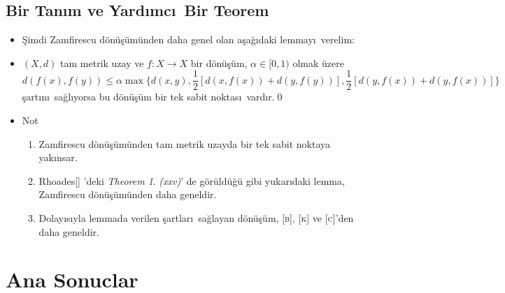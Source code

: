 \documentclass[sans,mathserif,8pt]{beamer}
\begin{document}
\subsection{Bir Tan\i m ve Yard\i mc\i\ Bir Teorem}
\begin{frame}
\begin{itemize}[<+-| alert@+>]  

 \item[] \c{S}imdi Zamfirescu d\"{o}n\"{u}\c{s}\"{u}m\"{u}nden daha genel olan a\c{s}a\u{g}\i daki lemmay\i\ verelim:

 \item[] \begin{lemma}
  $(X,d)$ tam metrik uzay ve $f: X \rightarrow X$ bir d\"{o}n\"{u}\c{s}\"{u}m,
  $\alpha \in [0,1)$ olmak \"uzere
  \begin{equation*}
    d(f(x), f(y))\leq \alpha\max\bigg\{ d(x,y), \frac{1}{2}[d(x,f(x))+d(y,f(y))], \frac{1}{2}[d(y,f(x))+d(y,f(x))] \bigg\} 
  \end{equation*}
  \c{s}art\i n\i\ sa\u{g}l\i yorsa bu d\"{o}n\"{u}\c{s}\"{u}m bir tek sabit noktas\i\ vard\i r.\qed
\end{lemma}

  \item[] \begin{block}{Not}
  \begin{enumerate}
  \item Zamfirescu d\"{o}n\"{u}\c{s}\"{u}m\"{u}nden tam metrik uzayda bir tek sabit noktaya yak\i nsar.
  \item Rhoades[] 'deki \emph{Theorem 1}. \emph{(xxv)}' de  g\"or\"uld\"u\u{g}\"u gibi yukar\i daki lemma,  Zamfirescu d\"{o}n\"{u}\c{s}\"{u}m\"{u}nden daha geneldir.  \item Dolay\i s\i yla lemmada verilen \c{s}artlar\i\ sa\u{g}layan d\"{o}n\"{u}\c{s}\"{u}m, \textsc{[b]}, \textsc{[k]} ve \textsc{[c]}'den daha geneldir.
\end{enumerate}
\end{block}
\end{itemize}

\end{frame}%

\section{Ana Sonuclar}
\end{document}
